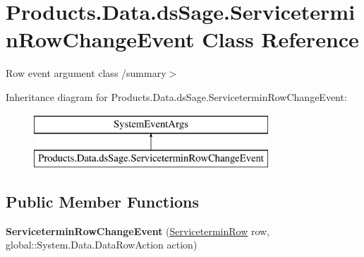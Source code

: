 \hypertarget{class_products_1_1_data_1_1ds_sage_1_1_servicetermin_row_change_event}{}\section{Products.\+Data.\+ds\+Sage.\+Servicetermin\+Row\+Change\+Event Class Reference}
\label{class_products_1_1_data_1_1ds_sage_1_1_servicetermin_row_change_event}


Row event argument class /summary$>$  


Inheritance diagram for Products.\+Data.\+ds\+Sage.\+Servicetermin\+Row\+Change\+Event\+:\begin{figure}[H]
\begin{center}
\leavevmode
\includegraphics[height=2.000000cm]{class_products_1_1_data_1_1ds_sage_1_1_servicetermin_row_change_event}
\end{center}
\end{figure}
\subsection*{Public Member Functions}
\begin{DoxyCompactItemize}
\item 
{\bfseries Servicetermin\+Row\+Change\+Event} (\hyperlink{class_products_1_1_data_1_1ds_sage_1_1_servicetermin_row}{Servicetermin\+Row} row, global\+::\+System.\+Data.\+Data\+Row\+Action action)\hypertarget{class_products_1_1_data_1_1ds_sage_1_1_servicetermin_row_change_event_a479f11ddb18ef281e2e4da5852374543}{}\label{class_products_1_1_data_1_1ds_sage_1_1_servicetermin_row_change_event_a479f11ddb18ef281e2e4da5852374543}

\end{DoxyCompactItemize}
